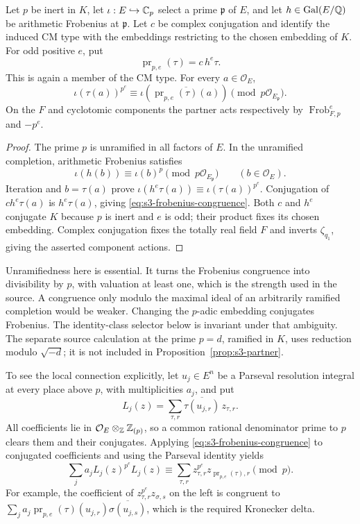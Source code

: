 \begin{proposition}
\label{prop:s3-partner}
Let $p$ be inert in $K$, let $\iota:E\hookrightarrow\mathbb C_p$ select
a prime $\mathfrak p$ of $E$, and let $h\in\operatorname{Gal}(E/\mathbb Q)$ be
arithmetic Frobenius at $\mathfrak p$. Let $c$ be complex conjugation
and identify the induced CM type with the embeddings restricting
to the chosen embedding of $K$. For odd positive $e$, put
\[
 \operatorname{pr}_{p,e}(\tau)=c\,h^e\tau.
\]
This is again a member of the CM type. For every $a\in\mathcal O_E$,
\begin{equation}\label{eq:s3-frobenius-congruence}
 \iota(\tau(a))^{p^e}
 \equiv\iota\!\left(\overline{\operatorname{pr}_{p,e}(\tau)(a)}\right)
 \pmod {p\mathcal O_{E_{\mathfrak p}}}.
\end{equation}
On the $F$ and cyclotomic components the partner acts respectively
by $\operatorname{Frob}_{F,p}^{e}$ and $-p^e$.
\end{proposition}

\begin{proof}
The prime $p$ is unramified in all factors of $E$. In the unramified
completion, arithmetic Frobenius satisfies
\[
 \iota(h(b))\equiv\iota(b)^p\pmod{p\mathcal O_{E_{\mathfrak p}}}
 \qquad(b\in\mathcal O_E).
\]
Iteration and $b=\tau(a)$ prove
$\iota(h^e\tau(a))\equiv\iota(\tau(a))^{p^e}$.
Conjugation of $c h^e\tau(a)$ is $h^e\tau(a)$, giving
\eqref{eq:s3-frobenius-congruence}. Both $c$ and $h^e$ conjugate
$K$ because $p$ is inert and $e$ is odd; their product fixes its
chosen embedding. Complex conjugation fixes the totally real
field $F$ and inverts $\zeta_{q_1}$, giving the asserted component
actions.
\end{proof}

Unramifiedness here is essential. It turns the Frobenius congruence
into divisibility by $p$, with valuation at least one, which is the
strength used in the source. A congruence only modulo the maximal
ideal of an arbitrarily ramified completion would be weaker.
Changing the $p$-adic embedding conjugates Frobenius. The
identity-class selector below is invariant under that ambiguity.
The separate source calculation at the prime $p=d$, ramified in
$K$, uses reduction modulo $\sqrt{-d}$; it is not included in
Proposition~\ref{prop:s3-partner}.

To see the local connection explicitly, let $u_j\in E^n$ be a
Parseval resolution integral at every place above $p$, with
multiplicities $a_j$,
and put
\[
 L_j(z)=\sum_{\tau,r}\overline{\tau(u_{j,r})}\,z_{\tau,r}.
\]
All coefficients lie in $\mathcal O_E\otimes_{\mathbb Z}\mathbb Z_{(p)}$, so a
common rational denominator prime to $p$ clears them and their
conjugates. Applying
\eqref{eq:s3-frobenius-congruence} to conjugated coefficients and
using the Parseval identity yields
\begin{equation}\label{eq:s3-coupling}
 \sum_j a_j L_j(z)^{p^e}L_j(z)
 \equiv\sum_{\tau,r}z_{\tau,r}^{p^e}
 z_{\operatorname{pr}_{p,e}(\tau),r}\pmod p.
\end{equation}
For example, the coefficient of $z_{\tau,r}^{p^e}z_{\sigma,s}$
on the left is congruent to
$\sum_j a_j\operatorname{pr}_{p,e}(\tau)(u_{j,r})
\overline{\sigma(u_{j,s})}$, which is the required Kronecker delta.

